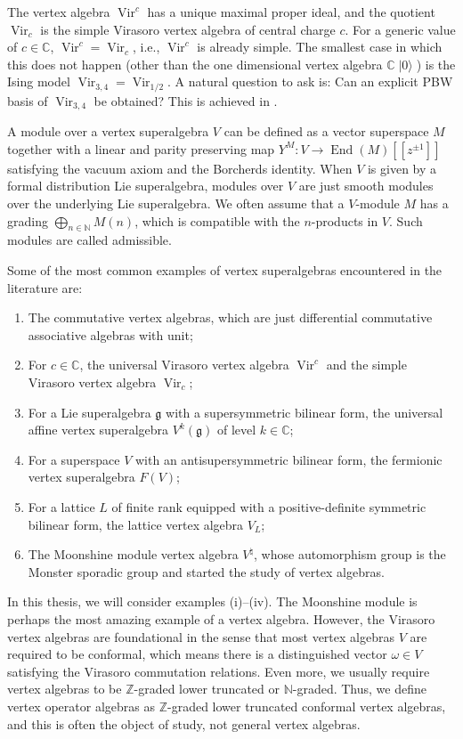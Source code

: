 \documentclass[a4paper, 12pt, reqno]{amsart}
\theoremstyle{remark}
\DeclareMathOperator{\Vir}{Vir}
\DeclareMathOperator{\End}{End}
\DeclareMathOperator{\vac}{|0\rangle}
\begin{document}
The vertex algebra $\Vir^c$ has a unique maximal proper ideal, and the quotient $\Vir_c$ is the simple Virasoro vertex algebra of central charge $c$.
For a generic value of $c \in \mathbb{C}$, $\Vir^c = \Vir_c$, i.e., $\Vir^c$ is already simple.
The smallest case in which this does not happen (other than the one dimensional vertex algebra $\mathbb{C}\vac$) is the Ising model $\Vir_{3, 4} = \Vir_{1/2}$.
A natural question to ask is: Can an explicit PBW basis of $\Vir_{3, 4}$ be obtained?
This is achieved in \cite{andrews_singular_2022}.

A module over a vertex superalgebra $V$ can be defined as a vector superspace $M$ together with a linear and parity preserving map $Y^M: V \to \End(M)[[z^{\pm1}]]$ satisfying the vacuum axiom and the Borcherds identity.
When $V$ is given by a formal distribution Lie superalgebra, modules over $V$ are just smooth modules over the underlying Lie superalgebra.
We often assume that a $V$-module $M$ has a grading $\bigoplus_{n \in \mathbb{N}}M(n)$, which is compatible with the $n$-products in $V$.
Such modules are called admissible.

Some of the most common examples of vertex superalgebras encountered in the literature are:
\begin{enumerate}
\item The commutative vertex algebras, which are just differential commutative associative algebras with unit;
\item For $c \in \mathbb{C}$, the universal Virasoro vertex algebra $\Vir^c$ and the simple Virasoro vertex algebra $\Vir_c$;
\item For a Lie superalgebra $\mathfrak{g}$ with a supersymmetric bilinear form, the universal affine vertex superalgebra $V^k(\mathfrak{g})$ of level $k \in \mathbb{C}$;
\item For a superspace $V$ with an antisupersymmetric bilinear form, the fermionic vertex superalgebra $F(V)$;
\item For a lattice $L$ of finite rank equipped with a positive-definite symmetric bilinear form, the lattice vertex algebra $V_L$;
\item The Moonshine module vertex algebra $V^{\natural}$, whose automorphism group is the Monster sporadic group and started the study of vertex algebras.
\end{enumerate}
In this thesis, we will consider examples (i)--(iv).
The Moonshine module is perhaps the most amazing example of a vertex algebra.
However, the Virasoro vertex algebras are foundational in the sense that most vertex algebras $V$ are required to be conformal, which means there is a distinguished vector $\omega \in V$ satisfying the Virasoro commutation relations.
Even more, we usually require vertex algebras to be $\mathbb{Z}$-graded lower truncated or $\mathbb{N}$-graded.
Thus, we define vertex operator algebras as $\mathbb{Z}$-graded lower truncated conformal vertex algebras, and this is often the object of study, not general vertex algebras.
\end{document}
